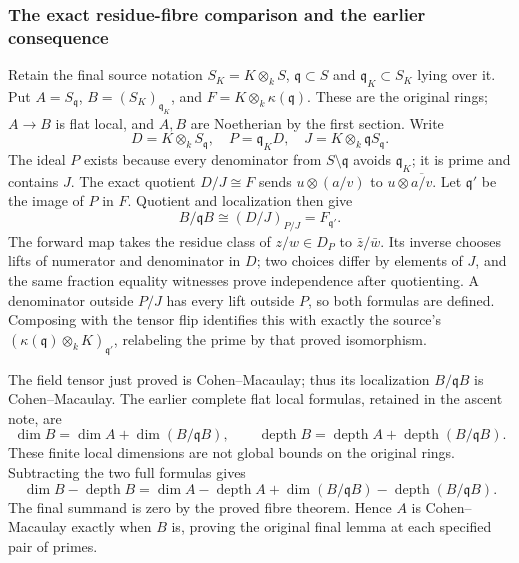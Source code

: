 \subsubsection{The exact residue-fibre comparison and the earlier consequence}\label{the-exact-residue-fibre-comparison-and-the-earlier-consequence}

Retain the final source notation \(S_K=K\otimes_kS\), \(\mathfrak q\subset S\) and \(\mathfrak q_K\subset S_K\) lying over it. Put \(A=S_{\mathfrak q}\), \(B=(S_K)_{\mathfrak q_K}\), and \(F=K\otimes_k\kappa(\mathfrak q)\). These are the original rings; \(A\to B\) is flat local, and \(A,B\) are Noetherian by the first section. Write \[
 D=K\otimes_kS_{\mathfrak q},\quad
 P=\mathfrak q_KD,\quad
 J=K\otimes_k\mathfrak q S_{\mathfrak q}.
\] The ideal \(P\) exists because every denominator from \(S\setminus\mathfrak q\) avoids \(\mathfrak q_K\); it is prime and contains \(J\). The exact quotient \(D/J\cong F\) sends \(u\otimes(a/v)\) to \(u\otimes\overline{a/v}\). Let \(\mathfrak q'\) be the image of \(P\) in \(F\). Quotient and localization then give \[
 B/\mathfrak q B\cong(D/J)_{P/J}=F_{\mathfrak q'}.
\] The forward map takes the residue class of \(z/w\in D_P\) to \(\bar z/\bar w\). Its inverse chooses lifts of numerator and denominator in \(D\); two choices differ by elements of \(J\), and the same fraction equality witnesses prove independence after quotienting. A denominator outside \(P/J\) has every lift outside \(P\), so both formulas are defined. Composing with the tensor flip identifies this with exactly the source's \((\kappa(\mathfrak q)\otimes_kK)_{\mathfrak q'}\), relabeling the prime by that proved isomorphism.

The field tensor just proved is Cohen--Macaulay; thus its localization \(B/\mathfrak q B\) is Cohen--Macaulay. The earlier complete flat local formulas, retained in the ascent note, are \[
 \dim B=\dim A+\dim(B/\mathfrak qB),\qquad
 \operatorname{depth}B=\operatorname{depth}A+
                      \operatorname{depth}(B/\mathfrak qB).
\] These finite local dimensions are not global bounds on the original rings. Subtracting the two full formulas gives \[
 \dim B-\operatorname{depth}B=
 \dim A-\operatorname{depth}A+
 \dim(B/\mathfrak qB)-\operatorname{depth}(B/\mathfrak qB).
\] The final summand is zero by the proved fibre theorem. Hence \(A\) is Cohen--Macaulay exactly when \(B\) is, proving the original final lemma at each specified pair of primes.

